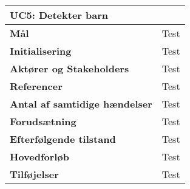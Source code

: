 \begin{table}[H] \centering
\begin{tabular}{|p{6cm}|p{8cm}|}
	\hline
\multicolumn{2}{|l|}{\textbf{UC5: Detekter barn}} \\\hline
\textbf{Mål}								&Test \\\hline
\textbf{Initialisering}					&Test \\\hline
\textbf{Aktører og Stakeholders}			&Test \\\hline
\textbf{Referencer}						&Test \\\hline
\textbf{Antal af samtidige hændelser}	&Test \\\hline
\textbf{Forudsætning}					&Test \\\hline
\textbf{Efterfølgende tilstand}			&Test \\\hline
\textbf{Hovedforløb}						&Test \\\hline
\textbf{Tilføjelser}						&Test \\\hline
	\end{tabular}
	\label{UC5} 
\end{table}